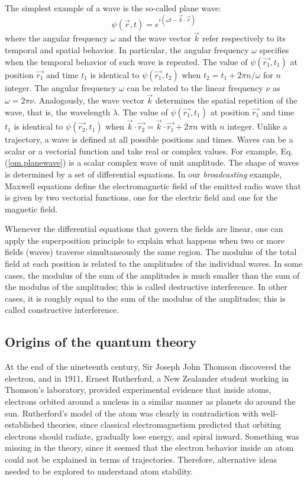 \documentclass[onecolumn,nofootinbib, secnumarabic, amsmath, nobibnotes,12pt,aps,pra]{revtex4-1}
\newcommand{\eref}[1]{Eq. (\ref{#1})}
\begin{document}
The simplest example of a wave is the so-called plane wave:
\begin{equation} \label{om.planewave}
\psi(\vec{r},t) = e^{i(\omega t- \vec{k} \cdot \vec{r})}
\end{equation}
where the angular frequency $\omega$ and the wave vector $\vec{k}$
refer respectively to its temporal and spatial behavior. In
particular, the angular frequency $\omega$ specifies when the
temporal behavior of such wave is repeated. The value of
$\psi(\vec{r_1},t_1) $ at position $\vec{r_1}$ and time $t_1$ is
identical to $\psi(\vec{r_1},t_2) $ when $t_2 = t_1 + 2 \pi
n/\omega$ for $n$ integer. The angular frequency $\omega$ can be
related to the linear frequency $\nu$ as $ \omega = 2 \pi \nu$.
Analogously, the wave vector $\vec{k}$ determines the spatial
repetition of the wave, that is, the wavelength $\lambda$. The value
of $\psi(\vec{r_1},t_1)$ at position $\vec{r_1}$ and time $t_1$ is
identical to $\psi(\vec{r_2},t_1)$ when $\vec{k}\cdot\vec{r_2} =
\vec{k}\cdot\vec{r_1} + 2 \pi n$ with $n$ integer. Unlike a
trajectory, a wave is defined at all possible positions and times.
Waves can be a scalar or a vectorial function and take real or
complex values. For example, \eref{om.planewave} is a scalar complex
wave of unit amplitude. The shape of waves is determined by a set of
differential equations. In our \textit{broadcasting} example,
Maxwell equations define the electromagnetic field of the emitted
radio wave that is given by two vectorial functions, one for the
electric field and one for the magnetic field.

Whenever the differential equations that govern the fields are
linear, one can apply the superposition principle to explain what
happens when two or more fields (waves) traverse simultaneously the
same region. The modulus of the total field at each position is
related to the amplitudes of the individual waves. In some cases,
the modulus of the sum of the amplitudes is much smaller than the
sum of the modulus of the amplitudes; this is called destructive
interference. In other cases, it is roughly equal to the sum of the
modulus of the amplitudes; this is called constructive  interference.

\subsection{Origins of the quantum theory}\label{om.sec_intro.2}

At the end of the nineteenth century, Sir Joseph John Thomson discovered the electron, and in 1911, Ernest Rutherford, a New Zealander student working in Thomson's laboratory, provided experimental evidence that inside atoms, electrons orbited around a nucleus in a similar manner as planets do around the sun.
Rutherford's model of the atom was clearly in contradiction with well-established theories, since classical electromagnetism predicted that orbiting electrons should radiate, gradually lose energy, and spiral inward.
Something was missing in the theory, since it seemed that the electron behavior inside an atom could not be explained in terms of trajectories. Therefore, alternative ideas needed to be explored to understand atom stability.
\end{document}
